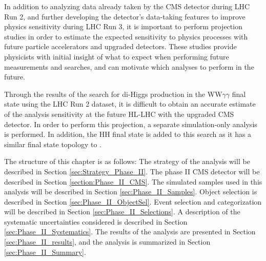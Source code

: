 
In addition to analyzing data already taken by the CMS detector during LHC Run 2, and further developing the detector's data-taking features to improve physics sensitivity during LHC Run 3, it is important to perform projection studies in order to estimate the expected sensitivity to physics processes with future particle accelerators and upgraded detectors. These studies provide physicists with initial insight of what to expect when performing future measurements and searches, and can motivate which analyses to perform in the future.

Through the results of the search for di-Higgs production in the WW$\gamma\gamma$ final state using the LHC Run 2 dataset, it is difficult to obtain an accurate estimate of the analysis sensitivity at the future HL-LHC with the upgraded CMS detector. In order to perform this projection, a separate simulation-only analysis is performed. In addition, the \ttgg HH final state is added to this search as it has a similar final state topology to \wwgg. 

The structure of this chapter is as follows: The strategy of the analysis will be described in Section \ref{sec:Strategy_Phase_II}. The phase II CMS detector will be described in Section \ref{section:Phase_II_CMS}. The simulated samples used in this analysis will be described in Section \ref{sec:Phase_II_Samples}. Object selection is described in Section \ref{sec:Phase_II_ObjectSel}. Event selection and categorization will be described in Section \ref{sec:Phase_II_Selections}. A description of the systematic uncertainties considered is described in Section \ref{sec:Phase_II_Systematics}. The results of the analysis are presented in Section \ref{sec:Phase_II_results}, and the analysis is summarized in Section \ref{sec:Phase_II_Summary}. 








